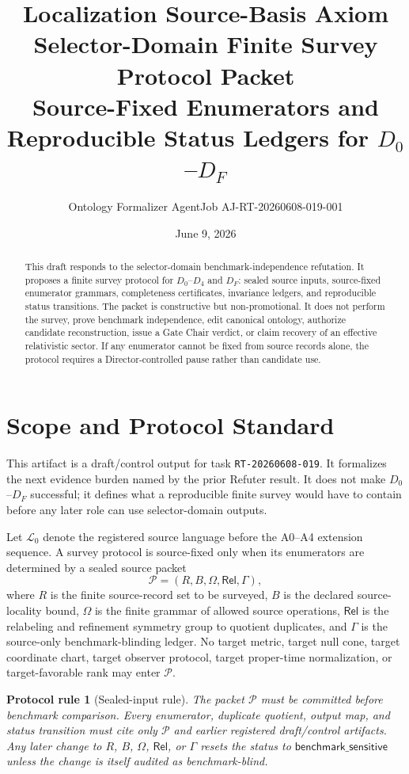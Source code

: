 \documentclass[11pt]{article}
\title{\textbf{Localization Source-Basis Axiom Selector-Domain Finite Survey Protocol Packet}\\[0.35em]
\large Source-Fixed Enumerators and Reproducible Status Ledgers for \(D_0\)--\(D_F\)}
\author{Ontology Formalizer AgentJob AJ-RT-20260608-019-001}
\date{June 9, 2026}
\newcommand{\Lang}{\mathcal{L}_{0}}
\newcommand{\Pack}{\mathcal{P}}
\newcommand{\Rel}{\mathsf{Rel}}
\newtheorem{protocol}{Protocol rule}
\begin{document}
\maketitle

\begin{abstract}
This draft responds to the selector-domain benchmark-independence refutation.
It proposes a finite survey protocol for \(D_0\)--\(D_4\) and \(D_F\):
sealed source inputs, source-fixed enumerator grammars, completeness
certificates, invariance ledgers, and reproducible status transitions. The
packet is constructive but non-promotional. It does not perform the survey,
prove benchmark independence, edit canonical ontology, authorize candidate
reconstruction, issue a Gate Chair verdict, or claim recovery of an
effective relativistic sector. If any enumerator cannot be fixed from source
records alone, the protocol requires a Director-controlled pause rather than
candidate use.
\end{abstract}

\section{Scope and Protocol Standard}

This artifact is a draft/control output for task \texttt{RT-20260608-019}.
It formalizes the next evidence burden named by the prior Refuter result. It
does not make \(D_0\)--\(D_F\) successful; it defines what a reproducible
finite survey would have to contain before any later role can use
selector-domain outputs.

Let \(\Lang\) denote the registered source language before the A0--A4
extension sequence. A survey protocol is source-fixed only when its
enumerators are determined by a sealed source packet
\[
\Pack=(R,B,\Omega,\Rel,\Gamma),
\]
where \(R\) is the finite source-record set to be surveyed, \(B\) is the
declared source-locality bound, \(\Omega\) is the finite grammar of allowed
source operations, \(\Rel\) is the relabeling and refinement symmetry group
to quotient duplicates, and \(\Gamma\) is the source-only benchmark-blinding
ledger. No target metric, target null cone, target coordinate chart, target
observer protocol, target proper-time normalization, or target-favorable rank
may enter \(\Pack\).

\begin{protocol}[Sealed-input rule]
The packet \(\Pack\) must be committed before benchmark comparison. Every
enumerator, duplicate quotient, output map, and status transition must cite
only \(\Pack\) and earlier registered draft/control artifacts. Any later
change to \(R\), \(B\), \(\Omega\), \(\Rel\), or \(\Gamma\) resets the status
to \(\mathsf{benchmark\_sensitive}\) unless the change is itself audited as
benchmark-blind.
\end{protocol}
\end{document}
